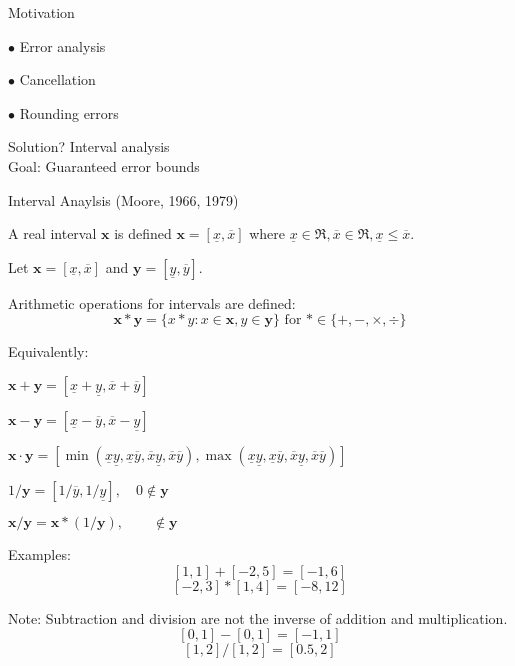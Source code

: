 \documentclass{slides}
\begin{document}
\begin{slide}
\begin{center}
Motivation
\end{center}
$\bullet$ Error analysis 

$\bullet$ Cancellation 

$\bullet$ Rounding errors

Solution?  Interval analysis \\

Goal: Guaranteed error bounds

\end{slide}
\begin{slide}
\begin{center}
Interval Anaylsis (Moore, 1966, 1979)
\end{center}
A real interval $\mathbf{x}$ is defined 
$\mathbf{x} = [\underline{x},\overline{x}]$
where $\underline{x} \in \Re, \overline{x} \in \Re, 
  \underline{x} \leq \overline{x}$.

Let $\mathbf{x} = [\underline{x}, \overline{x}]$ and 
$\mathbf{y} = [\underline{y}, \overline{y}]$.

Arithmetic operations for intervals are defined:
$$
\mathbf{x} * \mathbf{y} = \{x * y : x \in \mathbf{x}, y \in \mathbf{y} \} 
\mbox{ for } * \in \{ +,-,\times,\div\}
$$

Equivalently:

$\mathbf{x} + \mathbf{y} = [\underline{x} + \underline{y}, 
 \overline{x}+ \overline{y}]$

$\mathbf{x}  - \mathbf{y} = [\underline{x}-\overline{y}, 
 \overline{x}-\underline{y}]$

$\mathbf{x}  \cdot \mathbf{y} = [\min(\underline{x}\underline{y},
    \underline{x}\overline{y}, \overline{x}\underline{y},
    \overline{x}\overline{y}),
  \max(\underline{x}\underline{y}, \underline{x}\overline{y}, 
       \overline{x}\underline{y}, \overline{x}\overline{y})]$

$ 1 / \mathbf{y} = [1/\overline{y}, 1/\underline{y}], 
      \quad 0 \notin \mathbf{y} $

$\mathbf{x}  / \mathbf{y} = \mathbf{x} * (1/\mathbf{y}), \qquad  \notin \mathbf
{y} $
\end{slide}
\begin{slide}
Examples:
$$[1,1] + [-2,5] = [-1,6]$$
$$[-2,3] * [1,4] = [-8,12]$$

Note:
Subtraction and division are not the inverse of addition and multiplication.
$$[0,1]-[0,1] = [-1,1]$$
$$[1,2]/[1,2] = [0.5, 2]$$
\end{slide}
\end{document}
